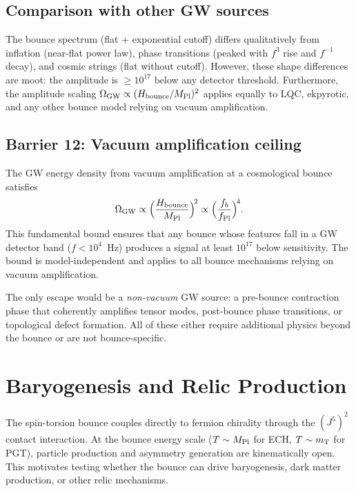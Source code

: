\documentclass[aps,prd,twocolumn,superscriptaddress,showpacs,preprintnumbers,
  nofootinbib,longbibliography,floatfix]{revtex4-2}
\newcommand{\MPl}{M_{\rm Pl}}
\newcommand{\OmGW}{\Omega_{\rm GW}}
\newcommand{\mT}{m_{\rm T}}
\begin{document}
\subsection{Comparison with other GW sources}

The bounce spectrum (flat + exponential cutoff) differs qualitatively
from inflation (near-flat power law), phase transitions (peaked with
$f^3$ rise and $f^{-1}$ decay), and cosmic strings (flat without cutoff).
However, these shape differences are moot: the amplitude is $\geq 10^{17}$
below any detector threshold. Furthermore, the amplitude scaling
$\OmGW \propto (H_{\rm bounce}/\MPl)^2$ applies equally to LQC,
ekpyrotic, and any other bounce model relying on vacuum amplification.

\subsection{Barrier 12: Vacuum amplification ceiling}

The GW energy density from vacuum amplification at a cosmological bounce
satisfies
\begin{equation}\label{eq:ceiling}
  \OmGW \propto \Bigl(\frac{H_{\rm bounce}}{\MPl}\Bigr)^{\!2}
  \propto \Bigl(\frac{f_b}{f_{\rm Pl}}\Bigr)^{\!4}.
\end{equation}
This fundamental bound ensures that any bounce whose features fall in a
GW detector band ($f < 10^4$~Hz) produces a signal at least $10^{17}$
below sensitivity. The bound is model-independent and applies to all
bounce mechanisms relying on vacuum amplification.

The only escape would be a \textit{non-vacuum} GW source: a pre-bounce
contraction phase that coherently amplifies tensor modes, post-bounce
phase transitions, or topological defect formation. All of these either
require additional physics beyond the bounce or are not bounce-specific.


\section{Baryogenesis and Relic Production}\label{sec:baryogenesis}

The spin-torsion bounce couples directly to fermion chirality through the
$(J^5)^2$ contact interaction. At the bounce energy scale ($T \sim \MPl$
for ECH, $T \sim \mT$ for PGT), particle production and asymmetry
generation are kinematically open. This motivates testing whether the
bounce can drive baryogenesis, dark matter production, or other relic
mechanisms.
\end{document}
